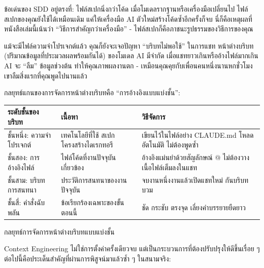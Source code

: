 ข้อเด่นของ SDD อยู่ตรงที่: ไฟล์สเปกนิ่งกว่าโค้ด เมื่อโมเดลรากฐานหรือเครื่องมือเปลี่ยนไป ไฟล์สเปกของคุณยังใช้ได้เหมือนเดิม แค่ให้เครื่องมือ AI ตัวใหม่สร้างโค้ดซ้ำอีกครั้งก็จบ นี่ก็คือเหตุผลที่หนังสือเล่มนี้เน้นว่า “วิธีการสำคัญกว่าเครื่องมือ” - ไฟล์สเปกก็คือภาชนะรูปธรรมของวิธีการของคุณ


แม้จะมีไฟล์ความจำโปรเจกต์แล้ว คุณก็ยังจะเจอปัญหา “บริบทไม่พอใช้” ในการแชท หน้าต่างบริบท (ปริมาณข้อมูลที่ประมวลผลพร้อมกันได้) ของโมเดล AI มีจำกัด เมื่อแชทยาวเกินหรืออ้างไฟล์มากเกิน AI จะ “ลืม” ข้อมูลช่วงต้น ทำให้คุณภาพผลงานตก - เหมือนคุณคุยกับเพื่อนคนหนึ่งนานหกชั่วโมง เขาลืมสิ่งแรกที่คุณพูดไปนานแล้ว

กลยุทธ์แกนของการจัดการหน้าต่างบริบทคือ “การอ้างอิงแบบแบ่งชั้น”:

\begin{center}
\begin{tabularx}{\linewidth}{|X|X|X|}
\hline
\textbf{ระดับชั้นของบริบท} & \textbf{เนื้อหา} & \textbf{วิธีจัดการ} \tabularnewline
\hline
ชั้นหนึ่ง: ความจำโปรเจกต์ & เทคโนโลยีที่ใช้ สเปก โครงสร้างไดเรกทอรี & เขียนไว้ในไฟล์อย่าง CLAUDE.md โหลดอัตโนมัติ ไม่ต้องพูดซ้ำ \tabularnewline
ชั้นสอง: การอ้างอิงไฟล์ & ไฟล์โค้ดที่งานปัจจุบันเกี่ยวข้อง & อ้างอิงแม่นยำด้วยสัญลักษณ์ @ ไม่ต้องวางเนื้อไฟล์เต็มลงในแชท \tabularnewline
ชั้นสาม: บริบทการสนทนา & ประวัติการสนทนาของงานปัจจุบัน & จบงานหนึ่งงานแล้วเปิดแชทใหม่ กันบริบทบวม \tabularnewline
ชั้นสี่: คำสั่งฉับพลัน & ข้อเรียกร้องเฉพาะของขั้นตอนนี้ & ชัด กระชับ ตรงจุด เลี่ยงคำบรรยายยืดยาว \tabularnewline
\hline
\end{tabularx}
\end{center}

\begin{center}\small\color{gray}กลยุทธ์การจัดการหน้าต่างบริบทแบบแบ่งชั้น\end{center}


Context Engineering ไม่ใช่การตั้งค่าครั้งเดียวจบ แต่เป็นกระบวนการที่ต้องปรับปรุงให้ดีขึ้นเรื่อย ๆ ต่อไปนี้คือประเด็นสำคัญที่ผ่านการพิสูจน์มาแล้วซ้ำ ๆ ในสนามจริง:

